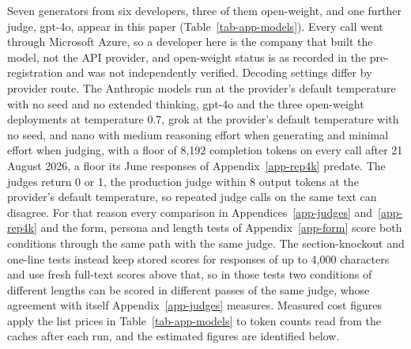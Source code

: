 Seven generators from six developers, three of them open-weight, and one
further judge, gpt-4o, appear in this paper (Table~\ref{tab-app-models}). Every call
went through Microsoft Azure, so a developer here is the company that built
the model, not the API provider, and open-weight status is as recorded in the
pre-registration and was not independently verified.
Decoding settings differ by provider route. The Anthropic models run at the
provider's default temperature with no seed and no extended thinking, gpt-4o
and the three open-weight deployments at temperature 0.7, grok at the
provider's default temperature with no seed, and nano with medium reasoning effort when generating
and minimal effort when judging, with a floor of 8,192 completion tokens on
every call after 21 August 2026, a floor its June responses of
Appendix~\ref{app-rep4k} predate.
The judges return 0 or 1, the production judge within 8 output tokens at the
provider's default temperature, so repeated judge calls on the same text can
disagree. For that reason every comparison in Appendices~\ref{app-judges}
and~\ref{app-rep4k} and the form, persona and length tests of
Appendix~\ref{app-form} score both conditions through the same path with the
same judge. The section-knockout and one-line tests instead keep stored
scores for responses of up to 4,000 characters and use fresh full-text
scores above that, so in those tests two conditions of different lengths can
be scored in different passes of the same judge, whose agreement with itself
Appendix~\ref{app-judges} measures.
Measured cost figures apply the list prices in Table~\ref{tab-app-models} to
token counts read from the caches after each run, and the estimated figures
are identified below.

